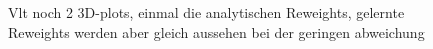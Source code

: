 \begin{figure}[htb]
	\centering
	\caption{Vlt noch 2 3D-plots, einmal die analytischen Reweights, gelernte Reweights werden aber gleich aussehen bei der geringen abweichung}
	\label{32,33}
\end{figure}
